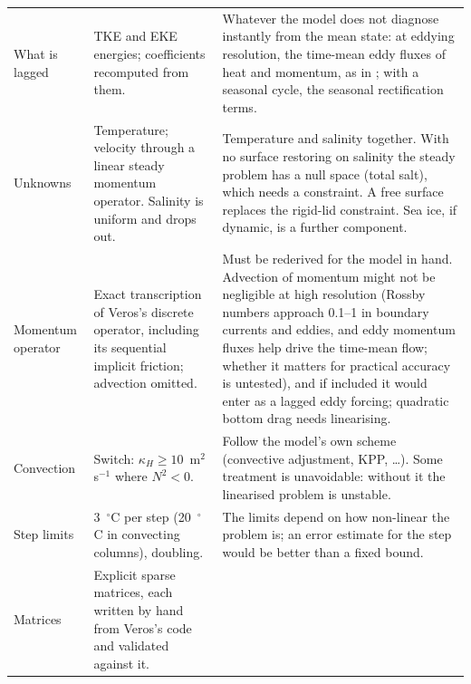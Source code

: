 \documentclass{article}
\begin{document}
{\begin{longtable}{>{\raggedright\arraybackslash}p{}|p{}|p{}}
What is lagged &
TKE and EKE energies; coefficients recomputed from them. &
Whatever the model does not diagnose instantly from the mean state: at eddying resolution, the time-mean eddy fluxes of heat and momentum, as in \citet{cooper2017}; with a seasonal cycle, the seasonal rectification terms. \\[1ex]
Unknowns &
Temperature; velocity through a linear steady momentum operator. Salinity is uniform and drops out. &
Temperature and salinity together. With no surface restoring on salinity the steady problem has a null space (total salt), which needs a constraint. A free surface replaces the rigid-lid constraint. Sea ice, if dynamic, is a further component. \\[1ex]
Momentum operator &
Exact transcription of Veros's discrete operator, including its sequential implicit friction; advection omitted. &
Must be rederived for the model in hand. Advection of momentum might not be negligible at high resolution (Rossby numbers approach 0.1--1 in boundary currents and eddies, and eddy momentum fluxes help drive the time-mean flow; whether it matters for practical accuracy is untested), and if included it would enter as a lagged eddy forcing; quadratic bottom drag needs linearising. \\[1ex]
Convection &
Switch: $\kappa_H\ge10$~m$^2$\,s$^{-1}$ where $N^2<0$. &
Follow the model's own scheme (convective adjustment, KPP, \dots). Some treatment is unavoidable: without it the linearised problem is unstable. \\[1ex]
Step limits &
3~$^\circ$C per step (20~$^\circ$C in convecting columns), doubling. &
The limits depend on how non-linear the problem is; an error estimate for the step would be better than a fixed bound. \\[1ex]
Matrices &
Explicit sparse matrices, each written by hand from Veros's code and validated against it. &

\end{longtable}}
\end{document}
